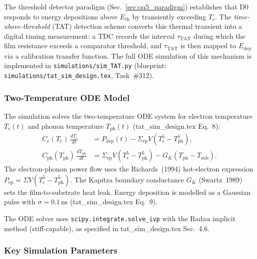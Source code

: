 The threshold detector paradigm (Sec.~\ref{sec:oq5_paradigm}) establishes that D0 responds
to energy depositions above $E_\mathrm{th}$ by transiently exceeding $T_c$.  The
\emph{time-above-threshold} (TAT) detection scheme converts this thermal transient into a
digital timing measurement: a TDC records the interval $\tau_\mathrm{TAT}$ during which the
film resistance exceeds a comparator threshold, and $\tau_\mathrm{TAT}$ is then mapped to
$E_\mathrm{dep}$ via a calibration transfer function.  The full ODE simulation of this
mechanism is implemented in \texttt{simulations/sim\_TAT.py}
(blueprint: \texttt{simulations/tat\_sim\_design.tex}, Task~\#312).

\subsubsection{Two-Temperature ODE Model}
\label{sec:oq5_tat_ode}

The simulation solves the two-temperature ODE system for electron temperature
$T_e(t)$ and phonon temperature $T_\mathrm{ph}(t)$
(tat\_sim\_design.tex Eq.~8):
\begin{align}
  C_e(T_e)\,\frac{dT_e}{dt}
    &= P_\mathrm{dep}(t) - \Sigma_\mathrm{ep} V (T_e^5 - T_\mathrm{ph}^5),
    \label{eq:tat_Te} \\
  C_\mathrm{ph}(T_\mathrm{ph})\,\frac{dT_\mathrm{ph}}{dt}
    &= \Sigma_\mathrm{ep} V (T_e^5 - T_\mathrm{ph}^5)
       - G_K (T_\mathrm{ph} - T_\mathrm{sub}).
    \label{eq:tat_Tph}
\end{align}
The electron-phonon power flow uses the
Richards~(1994) hot-electron expression
$P_\mathrm{ep} = \Sigma V (T_e^5 - T_\mathrm{ph}^5)$. %
The Kapitza boundary conductance $G_K$ (Swartz~1989) sets the film-to-substrate
heat leak. %
Energy deposition is modelled as a Gaussian pulse with $\sigma = 0.1$\,ns
(tat\_sim\_design.tex Eq.~9).

The ODE solver uses \texttt{scipy.integrate.solve\_ivp} with the Radau implicit
method (stiff-capable), as specified in tat\_sim\_design.tex Sec.~4.6.

\subsubsection{Key Simulation Parameters}
\label{sec:oq5_tat_params}

